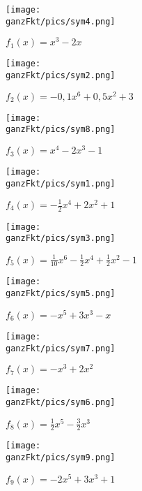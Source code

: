 \begin{minipage}{\textwidth}
	\begin{minipage}{0.33\textwidth}\centering
		\texttt{[image: \\ganzFkt/pics/sym4.png]}
		
		\(f_1(x)=x^3-2x\)
	\end{minipage}%
	\begin{minipage}{0.33\textwidth}\centering
		\texttt{[image: \\ganzFkt/pics/sym2.png]}
		
		\(f_2(x)=-0,1x^6+0,5x^2+3\)
	\end{minipage}%
	\begin{minipage}{0.33\textwidth}\centering
		\texttt{[image: \\ganzFkt/pics/sym8.png]}
		
		\(f_3(x)=x^4-2x^3-1\)
	\end{minipage}%
	
	\medskip
	
	\begin{minipage}{0.33\textwidth}\centering
		\texttt{[image: \\ganzFkt/pics/sym1.png]}
		
		\(f_4(x)= -\frac{1}{2}x^4+2x^2+1\)
	\end{minipage}%
	\begin{minipage}{0.33\textwidth}\centering
		\texttt{[image: \\ganzFkt/pics/sym3.png]}
		
		\(f_5(x)=\frac{1}{10}x^6-\frac{1}{2}x^4+\frac{1}{2}x^2-1\)
	\end{minipage}%
	\begin{minipage}{0.33\textwidth}\centering
		\texttt{[image: \\ganzFkt/pics/sym5.png]}
		
		\(f_6(x)=-x^5+3x^3-x\)
	\end{minipage}%
	
	\medskip
	
	\begin{minipage}{0.33\textwidth}\centering
		\texttt{[image: \\ganzFkt/pics/sym7.png]}
		
		\(f_7(x)=-x^3+2x^2\)
	\end{minipage}%
	\begin{minipage}{0.33\textwidth}\centering
		\texttt{[image: \\ganzFkt/pics/sym6.png]}
		
		\(f_8(x)=\frac{1}{2}x^5-\frac{3}{2}x^3\)
	\end{minipage}%
	\begin{minipage}{0.33\textwidth}\centering
		\texttt{[image: \\ganzFkt/pics/sym9.png]}
		
		\(f_9(x)=-2x^5+3x^3+1\)
	\end{minipage}%
\end{minipage}

